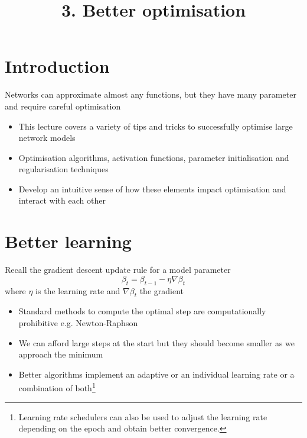 \documentclass[c]{beamer}
\title{3. Better optimisation}
\begin{document}
\maketitle


\section{Introduction}

\begin{frame}{\secname}
	Networks can approximate almost any functions, but they have many parameter and require careful optimisation
	\begin{itemize}
		\item This lecture covers a variety of tips and tricks to successfully optimise large network models
		\item Optimisation algorithms, activation functions, parameter initialisation and regularisation techniques
		\item Develop an intuitive sense of how these elements impact optimisation and interact with each other
	\end{itemize}
\end{frame}

\section{Better learning}

\begin{frame}{\secname}
	Recall the gradient descent update rule for a model parameter
	\begin{equation}
		\beta_t = \beta_{t-1} - \eta \nabla \beta_{t}
	\end{equation}
	where $\eta$ is the learning rate and $\nabla \beta_{t}$ the gradient
	\begin{itemize}
		\item Standard methods to compute the optimal step are computationally prohibitive e.g. Newton-Raphson %
		\item We can afford large steps at the start but they should become smaller as we approach the minimum
		\item Better algorithms implement an adaptive or an individual learning rate or a combination of both\footnote{ Learning rate schedulers can also be used to adjust the learning rate depending on the epoch and obtain better convergence.}
	\end{itemize}
\end{frame}
\end{document}
